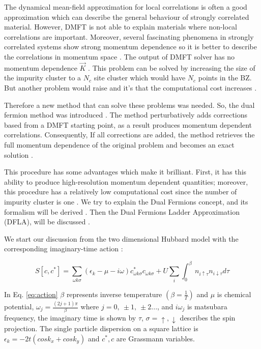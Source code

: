 The dynamical mean-field approximation for local correlations is often a good approximation which can describe the general behaviour of strongly correlated material. However, DMFT is not able to explain materials where non-local correlations are important. Moreover, several fascinating phenomena in strongly correlated systems show strong momentum dependence so it is better to describe the correlations in momentum space \cite{Rubtsov, Erik}. The output of DMFT solver has no momentum dependence $\vec{K}$ \cite{Antipov, Hettler}. This problem can be solved by increasing the size of the impurity cluster to a $N_c$ site cluster which would have $N_c$ points in the BZ. But another problem would raise and it's that the computational cost increases \cite{J.P}.

Therefore a new method that can solve these problems was needed. So, the dual fermion method was introduced \cite{Rubtsov, Haase, Hafermann, Junya, Yang}. The method perturbatively adds corrections based from a DMFT starting point, as a result produces  momentum dependent correlations. Consequently, If all corrections are added, the method retrieves the full momentum dependence of the original problem and becomes an exact solution \cite{J.P}. 

This procedure has some advantages which make it brilliant. First, it has this ability to produce high-resolution momentum dependent quantities; moreover, this procedure has a relatively low computational cost since the number of impurity cluster is one \cite{Haase, Hafermann, Junya}. We try to explain the Dual Fermions concept, and its formalism will be derived \cite{Rubtsov, Haase, Hafermann, Junya, Yang}. Then the Dual Fermions Ladder Approximation (DFLA), will be discussed \cite{J.P, Katsnelson}. 

We start our discussion from the two dimensional Hubbard model with the corresponding imaginary-time action \cite{Lichtenstein, Lechermann, ALichtenstein}:

\begin{equation}
    S[c, c^*]= \sum _{\omega k \sigma} (\epsilon _k - \mu - i\omega)c_{\omega k \sigma} ^*c_{\omega k \sigma} + U \sum _i \int _0 ^\beta \: n_{i \uparrow \tau} n_{i \downarrow \tau}d\tau
    \label{eq:action}
\end{equation}

\noindent In Eq. \ref{eq:action} $\beta$ represents inverse temperature $(\beta=\frac{1}{T})$ and $\mu$ is chemical potential, $\omega_j = \frac{(2j+1)\pi}{\beta}$ where $j=0, \: \pm1,\: \pm2...$, and $i\omega_j$ is matsubara frequency, the imaginary time is shown by $\tau$, $\sigma= \uparrow, \downarrow$ describes the spin projection. The single particle dispersion on a square lattice is $\epsilon_k = -2t(cos k_x+cos k_y)$ and $c^*, c$ are Grassmann variables.

